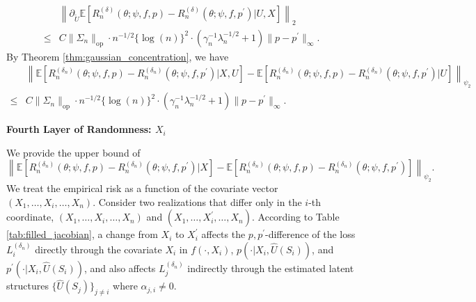 \documentclass[12pt]{article}
\newcommand{\E}{\mathbb{E}}
\begin{document}
\begin{align*}
    &\left\|\partial_{ \widetilde U}\E\left[R_n^{(\delta)}(\theta;\psi,f,p)-R_n^{(\delta)}(\theta;\psi,f,p^\prime)\bigg| U,X\right]\right\|_2\\
    \leq & C\|\Sigma_n\|_{\mathrm{op}}\cdot n^{-1/2}\{\log(n)\}^2\cdot\left(\gamma_n^{-1}\lambda_n^{-1/2}+1\right)\|p-p^\prime\|_\infty.
\end{align*}
By Theorem \ref{thm:gaussian_concentration}, we have
\begin{align*}
    &\left\|\E\left[R_n^{(\delta_n)}(\theta;\psi,f,p)-R_n^{({\delta_n})}(\theta;\psi,f,p^\prime)|X,U\right]-\E\left[R_n^{(\delta_n)}(\theta;\psi,f,p)-R_n^{({\delta_n})}(\theta;\psi,f,p^\prime)|U\right]\right\|_{\psi_2}\\
    \leq & C\|\Sigma_n\|_{\mathrm{op}}\cdot n^{-1/2}\{\log(n)\}^2\cdot\left(\gamma_n^{-1}\lambda_n^{-1/2}+1\right)\|p-p^\prime\|_\infty.
\end{align*}

\noindent\textbf{Fourth Layer of Randomness: $X_i$}

\noindent We provide the upper bound of
$$\left\|\E\left[R_n^{(\delta_n)}(\theta;\psi,f,p)-R_n^{({\delta_n})}(\theta;\psi,f,p^\prime)|X\right]-\E\left[R_n^{(\delta_n)}(\theta;\psi,f,p)-R_n^{({\delta_n})}(\theta;\psi,f,p^\prime)\right]\right\|_{\psi_2}.$$
We treat the empirical risk as a function of the covariate vector $(X_1, \ldots,X_i,\ldots, X_n)$. Consider two realizations that differ only in the $i$-th coordinate, $(X_1, \ldots,X_i,\ldots, X_n)$ and $(X_1, \ldots,X_i^\prime,\ldots, X_n)$. According to Table \ref{tab:filled_jacobian}, a change from $X_i$ to $X_i^\prime$ affects the $p,p^\prime$-difference of the loss $L_i^{(\delta_n)}$ directly through the covariate $X_i$ in $f(\cdot,X_i)$, $p(\cdot|X_i,\widehat U(S_i))$, and $p^\prime(\cdot|X_i,\widehat U(S_i))$, and also affects $L_j^{(\delta_n)}$ indirectly through the estimated latent structures $\{\widehat U(S_j)\}_{j\neq i}$ where $\alpha_{j,i}\neq 0$.
\end{document}
